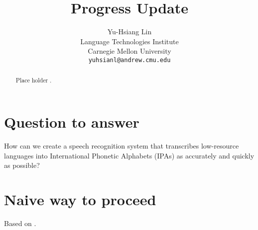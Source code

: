 \documentclass{article}
\title{Progress Update}
\author{
	Yu-Hsiang Lin
		\\
	Language Technologies Institute\\
	Carnegie Mellon University\\
	\texttt{yuhsianl@andrew.cmu.edu} \\
}
\begin{document}

\maketitle




\begin{abstract}

Place holder \cite{Adams2017}.

\end{abstract}



\section{Question to answer}

How can we create a speech recognition system that transcribes low-resource languages into International Phonetic Alphabets (IPAs) as accurately and quickly as possible?




\section{Naive way to proceed}

Based on \cite{Neubig2018}.
\end{document}

